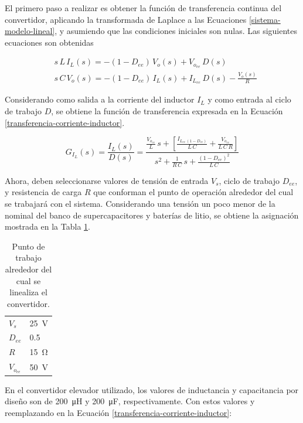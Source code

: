 El primero paso a realizar es obtener la función de transferencia continua del convertidor, aplicando la transformada de Laplace a las Ecuaciones \ref{sistema-modelo-lineal}, y asumiendo que las condiciones iniciales son nulas. Las siguientes ecuaciones son obtenidas

\begin{equation}
  \begin{split}
    & s \, L \, I_L(s) = - \left( 1 - D_{ee} \right) \, V_o(s) + V_{o_{ee}} \, D(s)
    \\
    & s \, C \, V_o(s) = - \left( 1 - D_{ee} \right) \, I_L(s) + I_{L_{ee}} \, D(s) - \frac{V_o(s)}{R}
    \label{sistema-modelo-laplace}
  \end{split}
\end{equation}

Considerando como salida a la corriente del inductor $I_L$ y como entrada al ciclo de trabajo $D$, se obtiene la función de transferencia expresada en la Ecuación \ref{transferencia-corriente-inductor}.

\begin{equation}
  \boxed{G_{I_L}(s) = \frac{I_L(s)}{D(s)} = \frac{\frac{V_{o_{ee}}}{L} \, s + \left[ \frac{I_{L_{ee} \, (1 - D_{ee})}}{L \, C} + \frac{V_{o_{ee}}}{L\,C\,R} \right]}{s^2 + \frac{1}{R\,C} \, s + \frac{\left( 1 - D_{ee} \right)^2}{L \, C}}}
  \label{transferencia-corriente-inductor}
\end{equation}

Ahora, deben seleccionarse valores de tensión de entrada $V_s$, ciclo de trabajo $D_{ee}$, y resistencia de carga $R$ que conforman el punto de operación alrededor del cual se trabajará con el sistema. Considerando una tensión un poco menor de la nominal del banco de supercapacitores y baterías de litio, se obtiene la asignación mostrada en la Tabla \ref{punto-trabajo-convertidor}.

\begin{table}[hbt!]
  \centering
  \begin{tabular}{l|l}
  $V_s$     & \SI{25}{\volt} \\
  $D_{ee}$    & 0.5 \\
  $R$        & \SI{15}{\ohm}  \\
  $V_{o_{ee}}$ & \SI{50}{\volt} 
  \end{tabular}
  \caption{Punto de trabajo alrededor del cual se linealiza el convertidor.}
  \label{punto-trabajo-convertidor}
\end{table}

En el convertidor elevador utilizado, los valores de inductancia y capacitancia por diseño son de \SI{200}{\micro\henry} y \SI{200}{\micro\farad}, respectivamente. Con estos valores y reemplazando en la Ecuación \ref{transferencia-corriente-inductor}:

